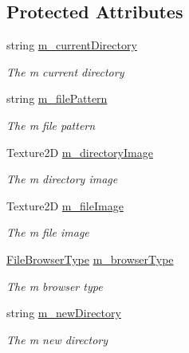 \subsection*{Protected Attributes}
\begin{DoxyCompactItemize}
\item 
string \hyperlink{class_lerp2_a_p_i_1_1_utility_1_1_file_browser_a64739db9d8936fcdbc04500689b9e1de}{m\+\_\+current\+Directory}
\begin{DoxyCompactList}\small\item\em The m current directory \end{DoxyCompactList}\item 
string \hyperlink{class_lerp2_a_p_i_1_1_utility_1_1_file_browser_adea5743811cda222cfe15df719687743}{m\+\_\+file\+Pattern}
\begin{DoxyCompactList}\small\item\em The m file pattern \end{DoxyCompactList}\item 
Texture2D \hyperlink{class_lerp2_a_p_i_1_1_utility_1_1_file_browser_ab295ca52f6c68ff56010dcf08634d7ed}{m\+\_\+directory\+Image}
\begin{DoxyCompactList}\small\item\em The m directory image \end{DoxyCompactList}\item 
Texture2D \hyperlink{class_lerp2_a_p_i_1_1_utility_1_1_file_browser_ac552300ef03a5750f01212b0ad80c8f8}{m\+\_\+file\+Image}
\begin{DoxyCompactList}\small\item\em The m file image \end{DoxyCompactList}\item 
\hyperlink{namespace_lerp2_a_p_i_1_1_utility_af5d628470963cc0f18c37055b4170bf1}{File\+Browser\+Type} \hyperlink{class_lerp2_a_p_i_1_1_utility_1_1_file_browser_af542154a498cf488e138869aa2ce3359}{m\+\_\+browser\+Type}
\begin{DoxyCompactList}\small\item\em The m browser type \end{DoxyCompactList}\item 
string \hyperlink{class_lerp2_a_p_i_1_1_utility_1_1_file_browser_a64798654cfafe8cb2310d0a1ce47babc}{m\+\_\+new\+Directory}
\begin{DoxyCompactList}\small\item\em The m new directory \end{DoxyCompactList}\item 

\end{DoxyCompactItemize}
